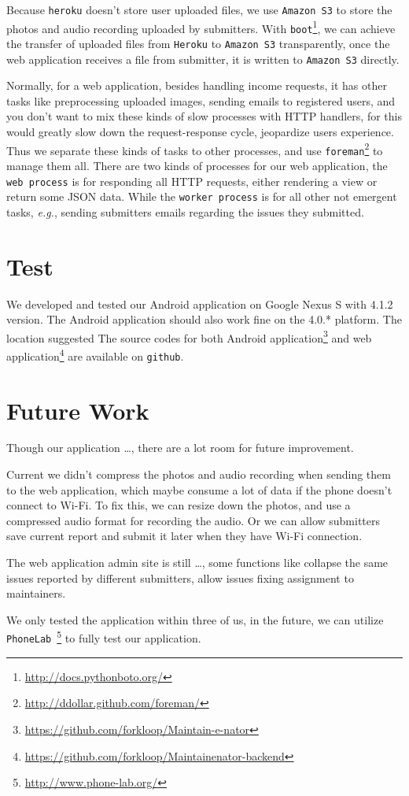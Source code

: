 \documentclass{acm_proc_article-sp}
\begin{document}
Because \texttt{heroku} doesn't store user uploaded files, we use \texttt{Amazon S3} to store the photos and audio recording uploaded by submitters.
With \texttt{boot}\footnote{\url{http://docs.pythonboto.org/}}, we can achieve the transfer of uploaded files from \texttt{Heroku} to \texttt{Amazon S3}
transparently, once the web application receives a file from submitter, it is written to \texttt{Amazon S3} directly.

Normally, for a web application, besides handling income requests, it has other tasks like preprocessing uploaded images, sending emails to registered users,
and you don't want to mix these kinds of slow processes with HTTP handlers, for this would greatly slow down the request-response cycle, jeopardize users
experience. Thus we separate these kinds of tasks to other processes,
and use \texttt{foreman}\footnote{\url{http://ddollar.github.com/foreman/}} to manage them all.
There are two kinds of processes for our web application, the \texttt{web process} is for responding all HTTP requests, either rendering a view or
return some JSON data. While the \texttt{worker process} is for all other not emergent tasks, \textit{e.g.}, sending submitters emails regarding the issues they
submitted.

\section{Test}
We developed and tested our Android application on Google Nexus S with 4.1.2 version. The Android application should also work fine on the
4.0.* platform. The location suggested \framedots
The source codes for both Android application\footnote{\url{https://github.com/forkloop/Maintain-e-nator}} and
web application\footnote{\url{https://github.com/forkloop/Maintainenator-backend}} are available on \texttt{github}.
\section{Future Work}
Though our application \ldots, there are a lot room for future improvement.
\begin{inparaenum}
 \item Current we didn't compress the photos and audio recording when sending them to the web application, which maybe consume a lot of data if the
 phone doesn't connect to Wi-Fi. To fix this, we can resize down the photos, and use a compressed audio format for recording the audio. Or we can allow
 submitters save current report and submit it later when they have Wi-Fi connection.
 \item The web application admin site is still \ldots, some functions like collapse the same issues reported by different submitters, allow issues fixing
 assignment to maintainers.
 \item We only tested the application within three of us, in the future, we can utilize \texttt{PhoneLab}~\footnote{\url{http://www.phone-lab.org/}} to
 fully test our application.
\end{inparaenum}
\end{document}
